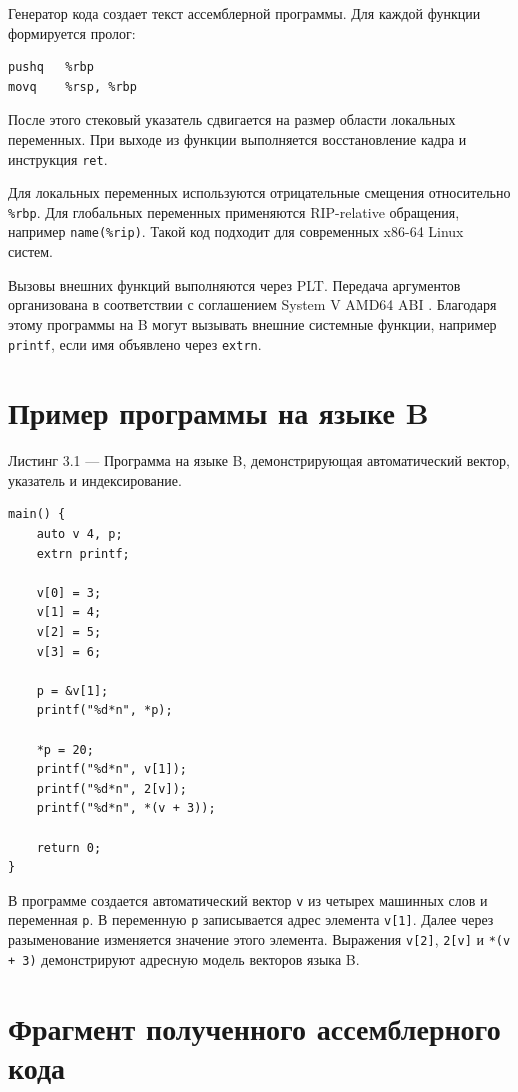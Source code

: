 Генератор кода создает текст ассемблерной программы. Для каждой функции формируется пролог:

\begin{verbatim}
pushq   %rbp
movq    %rsp, %rbp
\end{verbatim}

После этого стековый указатель сдвигается на размер области локальных переменных. При выходе из функции выполняется восстановление кадра и инструкция \texttt{ret}.

Для локальных переменных используются отрицательные смещения относительно \texttt{\%rbp}. Для глобальных переменных применяются RIP-relative обращения, например \texttt{name(\%rip)}. Такой код подходит для современных x86-64 Linux систем.

Вызовы внешних функций выполняются через PLT. Передача аргументов организована в соответствии с соглашением System V AMD64 ABI \cite{sysvabi}. Благодаря этому программы на B могут вызывать внешние системные функции, например \texttt{printf}, если имя объявлено через \texttt{extrn}.

\section{Пример программы на языке B}

Листинг 3.1 --- Программа на языке B, демонстрирующая автоматический вектор, указатель и индексирование.
\begin{verbatim}
main() {
    auto v 4, p;
    extrn printf;

    v[0] = 3;
    v[1] = 4;
    v[2] = 5;
    v[3] = 6;

    p = &v[1];
    printf("%d*n", *p);

    *p = 20;
    printf("%d*n", v[1]);
    printf("%d*n", 2[v]);
    printf("%d*n", *(v + 3));

    return 0;
}
\end{verbatim}

В программе создается автоматический вектор \texttt{v} из четырех машинных слов и переменная \texttt{p}. В переменную \texttt{p} записывается адрес элемента \texttt{v[1]}. Далее через разыменование изменяется значение этого элемента. Выражения \texttt{v[2]}, \texttt{2[v]} и \texttt{*(v + 3)} демонстрируют адресную модель векторов языка B.

\section{Фрагмент полученного ассемблерного кода}


